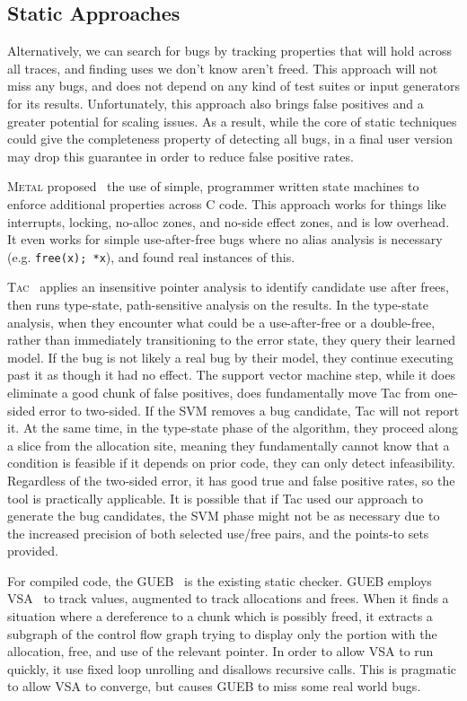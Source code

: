 \subsection{Static Approaches}
Alternatively, we can search for bugs by tracking properties that will hold across all traces, and finding uses we don't know aren't freed.
This approach will not miss any bugs, and does not depend on any kind of test suites or input generators for its results.
Unfortunately, this approach also brings false positives and a greater potential for scaling issues.
As a result, while the core of static techniques could give the completeness property of detecting all bugs, in a final user version may drop this guarantee in order to reduce false positive rates.

\textsc{Metal} proposed~\cite{metal} the use of simple, programmer written state machines to enforce additional properties across C code.
This approach works for things like interrupts, locking, no-alloc zones, and no-side effect zones, and is low overhead.
It even works for simple use-after-free bugs where no alias analysis is necessary (e.g. \texttt{free(x); *x}), and found real instances of this.

\textsc{Tac}~\cite{tac} applies an insensitive pointer analysis to identify candidate use after frees, then runs type-state, path-sensitive analysis on the results.
In the type-state analysis, when they encounter what could be a use-after-free or a double-free, rather than immediately transitioning to the error state, they query their learned model.
If the bug is not likely a real bug by their model, they continue executing past it as though it had no effect.
The support vector machine step, while it does eliminate a good chunk of false positives, does fundamentally move Tac from one-sided error to two-sided.
If the SVM removes a bug candidate, Tac will not report it.
At the same time, in the type-state phase of the algorithm, they proceed along a slice from the allocation site, meaning they fundamentally cannot know that a condition is feasible if it depends on prior code, they can only detect infeasibility.
Regardless of the two-sided error, it has good true and false positive rates, so the tool is practically applicable.
It is possible that if Tac used our approach to generate the bug candidates, the SVM phase might not be as necessary due to the increased precision of both selected use/free pairs, and the points-to sets provided.

For compiled code, the GUEB~\cite{gueb} is the existing static checker.
GUEB employs VSA~\cite{vsa} to track values, augmented to track allocations and frees.
When it finds a situation where a dereference to a chunk which is possibly freed, it extracts a subgraph of the control flow graph trying to display only the portion with the allocation, free, and use of the relevant pointer.
In order to allow VSA to run quickly, it use fixed loop unrolling and disallows recursive calls.
This is pragmatic to allow VSA to converge, but causes GUEB to miss some real world bugs.

